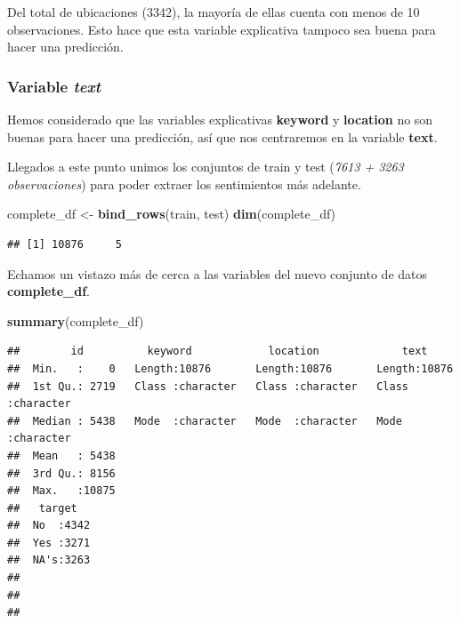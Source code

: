 \documentclass[
]{article}
\newenvironment{Shaded}{\begin{snugshade}}{\end{snugshade}}
\newcommand{\KeywordTok}[1]{\textcolor[rgb]{0.13,0.29,0.53}{\textbf{#1}}}
\newcommand{\NormalTok}[1]{#1}
\newcommand{\StringTok}[1]{\textcolor[rgb]{0.31,0.60,0.02}{#1}}
\begin{document}
Del total de ubicaciones (3342), la mayoría de ellas cuenta con menos de
10 observaciones. Esto hace que esta variable explicativa tampoco sea
buena para hacer una predicción.

\hypertarget{variable-text}{%
\subsubsection{\texorpdfstring{Variable
\emph{text}}{Variable text}}\label{variable-text}}

Hemos considerado que las variables explicativas \textbf{keyword} y
\textbf{location} no son buenas para hacer una predicción, así que nos
centraremos en la variable \textbf{text}.

Llegados a este punto unimos los conjuntos de train y test (\emph{7613 +
3263 observaciones}) para poder extraer los sentimientos más adelante.

\begin{Shaded}
\begin{Highlighting}[]
\NormalTok{complete_df <-}\StringTok{ }\KeywordTok{bind_rows}\NormalTok{(train, test)}
\KeywordTok{dim}\NormalTok{(complete_df)}
\end{Highlighting}
\end{Shaded}

\begin{verbatim}
## [1] 10876     5
\end{verbatim}

Echamos un vistazo más de cerca a las variables del nuevo conjunto de
datos \textbf{complete\_df}.

\begin{Shaded}
\begin{Highlighting}[]
\KeywordTok{summary}\NormalTok{(complete_df)}
\end{Highlighting}
\end{Shaded}

\begin{verbatim}
##        id          keyword            location             text          
##  Min.   :    0   Length:10876       Length:10876       Length:10876      
##  1st Qu.: 2719   Class :character   Class :character   Class :character  
##  Median : 5438   Mode  :character   Mode  :character   Mode  :character  
##  Mean   : 5438                                                           
##  3rd Qu.: 8156                                                           
##  Max.   :10875                                                           
##   target    
##  No  :4342  
##  Yes :3271  
##  NA's:3263  
##             
##             
## 
\end{verbatim}
\end{document}
